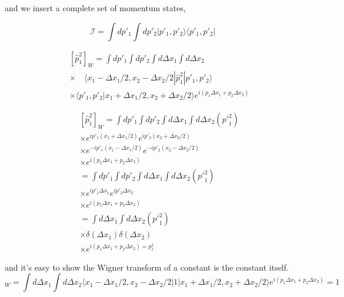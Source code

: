 \documentclass[phd,tocprelim]{cornell}
\begin{document}
and we insert a complete set of momentum states,

\begin{equation}
\mathcal{I}= \int dp'_1 \int dp'_2 |p'_1, p'_2\rangle \langle p'_1, p'_2 |
\end{equation}


\begin{eqnarray}
&&[\hat{p}_1^2]_W= \int dp'_1 \int dp'_2  \int d \Delta x_1 \int d \Delta x_2 \\ 
\nonumber
&& \times
\quad\langle {x}_1-\Delta {x}_{1}/{2},{x}_2-\Delta {x}_{2}/{2} | \hat{p}_{1}^2  |p'_1, p'_2\rangle \\ 
\nonumber
&& \times
 \langle p'_1, p'_2 | {x}_1+\Delta {x}_{1}/{2},{x}_2+\Delta {x}_{2}/{2} \rangle e^{i(p_1\Delta x_1+p_2\Delta x_2)}
\end{eqnarray}

\begin{eqnarray}
&&[\hat{p}_1^2]_W= \int dp'_1 \int dp'_2  \int d \Delta x_1 \int d \Delta x_2 
({p'}_{1}^2)
\\ 
\nonumber
&& \times
e^{ip'_1({x}_1+\Delta {x}_{1}/{2})}e^{ip'_2({x}_2+\Delta {x}_{2}/{2})}
\\ 
\nonumber
&& \times
e^{-ip'_1({x}_1-\Delta {x}_{1}/{2})}e^{-ip'_2({x}_2-\Delta {x}_{2}/{2})}
\\ 
\nonumber
&& \times
e^{i(p_1\Delta x_1+p_2\Delta x_2)}\\
\nonumber
&& = \int dp'_1 \int dp'_2 \int d \Delta x_1 \int d \Delta x_2 ({p'}_{1}^2)
\\ 
\nonumber
&& \times
e^{ip'_1\Delta {x}_{1}}e^{ip'_2\Delta {x}_{2}}
\\ 
\nonumber
&& \times
e^{i(p_1\Delta x_1+p_2\Delta x_2)}
\\ 
\nonumber
&&=
\int d \Delta x_1 \int d \Delta x_2 ({p'}_{1}^2)
\\ 
\nonumber
&& \times
\delta(\Delta {x}_{1})\delta(\Delta {x}_{2})
\\ 
\nonumber
&& \times
e^{i(p_1\Delta x_1+p_2\Delta x_2)= {p}_{1}^2}
\end{eqnarray}

and it's easy to show the Wigner transform of a constant is the constant itself. 
\begin{equation}
[1]_W=\int d \Delta x_1 \int d \Delta x_2 \langle {x}_1-\Delta {x}_{1}/{2},{x}_2-\Delta {x}_{2}/{2} | 1 | {x}_1+\Delta {x}_{1}/{2},{x}_2+\Delta {x}_{2}/{2} \rangle e^{i(p_1\Delta x_1+p_2\Delta x_2)}=1
\end{equation}
\end{document}
